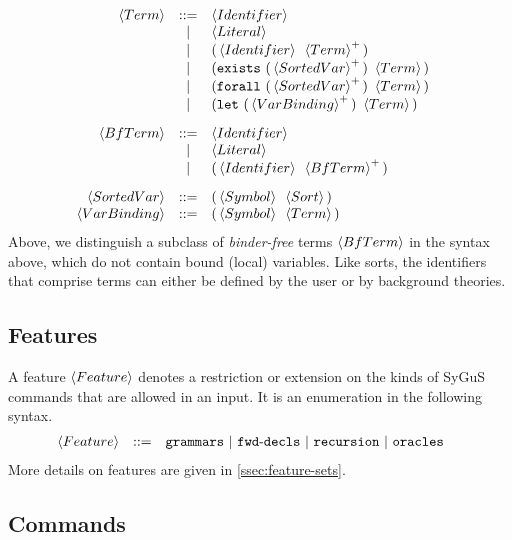 \documentclass[english,a4paper,10pt]{article}
\begin{document}
\begin{alignat*}{1}
 & \begin{array}{rcl}
\left\langle Term\right\rangle & ::= & \left\langle Identifier\right\rangle\\
 & | & \left\langle Literal\right\rangle\\
 & | & {\tt (}\left\langle Identifier\right\rangle\mbox{ }\left\langle Term\right\rangle^{+}{\tt )}\\
 & | & {\tt (}{\tt exists}\mbox{ }{\tt (}\left\langle SortedVar \right\rangle^{+}{\tt )}\mbox{ }\left\langle Term\right\rangle{\tt )}\\
 & | & {\tt (}{\tt forall}\mbox{ }{\tt (}\left\langle SortedVar \right\rangle^{+}{\tt )}\mbox{ }\left\langle Term\right\rangle{\tt )}\\
 & | & {\tt (}{\tt let}\mbox{ }{\tt (}\left\langle VarBinding \right\rangle^{+}{\tt )}\mbox{ }\left\langle Term\right\rangle{\tt )}\\[2ex]
 \left\langle BfTerm\right\rangle & ::= & \left\langle Identifier\right\rangle\\
 & | & \left\langle Literal\right\rangle\\
 & | & {\tt (}\left\langle Identifier\right\rangle\mbox{ }\left\langle BfTerm\right\rangle^{+}{\tt )}\\[2ex]
 \left\langle SortedVar \right\rangle & ::= & {\tt (}\left\langle Symbol\right\rangle\mbox{ }\left\langle Sort\right\rangle{\tt )}\\
 \left\langle VarBinding \right\rangle & ::= & {\tt (}\left\langle Symbol\right\rangle\mbox{ }\left\langle Term\right\rangle{\tt )}\\
\end{array}
\end{alignat*}
Above,
we distinguish a subclass of \emph{binder-free} terms $\left\langle BfTerm\right\rangle$ in the syntax above,
which do not contain bound (local) variables.
Like sorts, the identifiers that comprise terms
can either be defined by the user or by background theories.

\subsection{Features}
\label{ssec:syntax-features}

A feature $\left\langle Feature\right\rangle$ denotes a restriction or extension
on the kinds of SyGuS commands that are allowed in an input.
It is an enumeration in the following syntax.
\begin{alignat*}{1}
 & \begin{array}{rcl}
 \left\langle Feature\right\rangle & ::= & {\tt grammars}\mbox{ }|\mbox{ }{\tt fwd\mbox{-}decls}\mbox{ }|\mbox{ }{\tt recursion}\mbox{ }|\mbox{ } {\tt oracles}\mbox{ }
\end{array}
\end{alignat*}
More details on features are given in \cref{ssec:feature-sets}.

\subsection{Commands}
\end{document}

